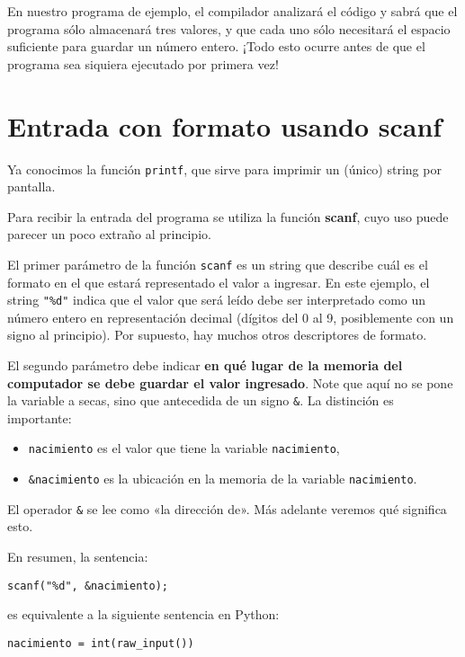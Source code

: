 En nuestro programa de ejemplo, el compilador analizará el código y
sabrá que el programa sólo almacenará tres valores, y que cada uno sólo
necesitará el espacio suficiente para guardar un número entero. ¡Todo
esto ocurre antes de que el programa sea siquiera ejecutado por primera
vez!

\section{Entrada con formato usando scanf}

Ya conocimos la función \lstinline!printf!, que sirve para imprimir un
(único) string por pantalla.

Para recibir la entrada del programa se utiliza la función
\textbf{scanf}, cuyo uso puede parecer un poco extraño al principio.

El primer parámetro de la función \lstinline!scanf! es un string que
describe cuál es el formato en el que estará representado el valor a
ingresar. En este ejemplo, el string \lstinline!"%d"! indica que el
valor que será leído debe ser interpretado como un número entero en
representación decimal (dígitos del 0 al 9, posiblemente con un signo al
principio). Por supuesto, hay muchos otros descriptores de formato.

El segundo parámetro debe indicar \textbf{en qué lugar de la memoria del
computador se debe guardar el valor ingresado}. Note que aquí no se pone
la variable a secas, sino que antecedida de un signo \lstinline!&!. La
distinción es importante:

\begin{itemize}
\item
  \lstinline!nacimiento! es el valor que tiene la variable
  \lstinline!nacimiento!,
\item
  \lstinline!&nacimiento! es la ubicación en la memoria de la variable
  \lstinline!nacimiento!.
\end{itemize}

El operador \lstinline!&! se lee como «la dirección de». Más adelante
veremos qué significa esto.

En resumen, la sentencia:

\begin{lstlisting}
scanf("%d", &nacimiento);
\end{lstlisting}

es equivalente a la siguiente sentencia en Python:

\begin{lstlisting}
nacimiento = int(raw_input())
\end{lstlisting}

